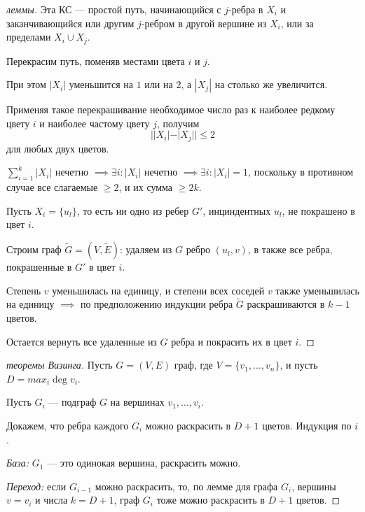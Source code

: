 \begin{proof}[ леммы]
    Эта КС --- простой путь, начинающийся с $j$-ребра в $X_i$ и заканчивающийся или другим $j$-ребром в другой вершине из $X_i$, или за пределами $X_i \cup X_j$.

    Перекрасим путь, поменяв местами цвета $i$ и $j$.

    При этом $|X_i|$ уменьшится на $1$ или на $2$, а $|X_j|$ на столько же увеличится.

    Применяя такое перекрашивание необходимое число раз к наиболее редкому цвету $i$ и наиболее частому цвету $j$, получим 
    \[ ||X_i| - |X_j|| \leq 2 \]
    для любых двух цветов.

    $\sum\limits_{i=1}^{k} |X_i|$ нечетно $\implies \exists i: |X_i|$ нечетно $\implies \exists i : |X_i| = 1$, поскольку в противном случае все слагаемые $\geq 2$, и их сумма $\geq 2k$.

    Пусть $X_i = \{u_l\}$, то есть ни одно из ребер $G'$, инциндентных $u_l$, не покрашено в цвет $i$.

    Строим граф $\tilde{G} = (V, \tilde{E})$: удаляем из $G$ ребро $(u_l, v)$, в также все ребра, покрашенные в $G'$ в цвет $i$.

    Степень $v$ уменьшилась на единицу, и степени всех соседей $v$ также уменьшилась на единицу $\implies$ по предположению индукции ребра $\tilde{G}$ раскрашиваются в $k - 1$ цветов.

    Остается вернуть все удаленные из $G$ ребра и покрасить их в цвет $i$.

\end{proof}

\begin{proof}[ теоремы Визинга]

    Пусть $G = (V, E)$ граф, где $V = \{v_1, \ldots, v_n\}$, и пусть $D = max_i \deg v_i$.

    Пусть $G_i$ --- подграф $G$ на вершинах $v_1, \ldots, v_i$.

    Докажем, что ребра каждого $G_i$ можно раскрасить в $D + 1$ цветов. Индукция по $i$.

    \textsl{База:} $G_1$ --- это одинокая вершина, раскрасить можно.

    \textsl{Переход:} если $G_{i-1}$ можно раскрасить, то, по лемме для графа $G_i$, вершины $v = v_i$ и числа $k = D + 1$, граф $G_i$ тоже можно раскрасить в $D+1$ цветов.

\end{proof}

